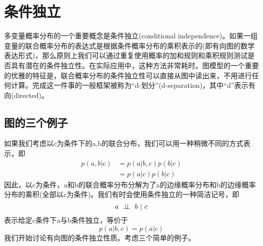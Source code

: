 \section{条件独立}
多变量概率分布的一个重要概念是条件独立(conditional independence)。如果一组变量的联合概率分布的表达式是根据条件概率分布的乘积表示的(即有向图的数学表达形式)，那么原则上我们可以通过重复使用概率的加和规则和乘积规则测试是否具有潜在的条件独立性。在实际应用中，这种方法非常耗时。图模型的一个重要的优雅的特征是，联合概率分布的条件独立性可以直接从图中读出来，不用进行任何计算。完成这一件事的一般框架被称为“d-划分”(d-separation)，其中“d”表示有向(directed)。
\subsection*{图的三个例子}
如果我们考虑以c为条件下的a,b的联合分布，我们可以用一种稍微不同的方式表示，即
\begin{equation}
\begin{aligned}
p(a,b|c)&=p(a|b,c)p(b|c)\\
&=p(a|c)p(b|c)
\end{aligned}
\end{equation}
因此，以c为条件，a和b的联合概率分布分解为了a的边缘概率分布和b的边缘概率分布的乘积(全部以c为条件)。我们有时会使用条件独立的一种简洁记号，即
\begin{equation}
	a\ \perp \!\!\! \perp\  b\ |\ c
\end{equation}
表示给定c条件下a与b条件独立，等价于
\begin{equation}
	p(a|b,c)=p(a|c)
\end{equation}
我们开始讨论有向图的条件独立性质。考虑三个简单的例子。
